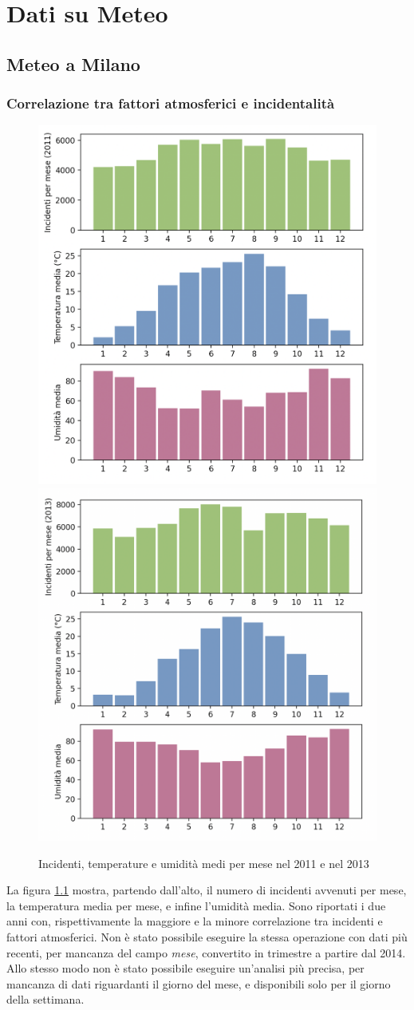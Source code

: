 \documentclass[a4paper]{report}
\begin{document}
\chapter{Dati su Meteo}

\section{Meteo a Milano}

\subsection{Correlazione tra fattori atmosferici e incidentalità}

\begin{figure}
    \includegraphics[width=0.5\linewidth]{../src/meteo/temp_incidenti_2011.png}
    \includegraphics[width=0.5\linewidth]{../src/meteo/temp_incidenti_2013.png}
    \caption{Incidenti, temperature e umidità medi per mese nel 2011 e nel 2013}
    \label{fig:incidenti-temp}
\end{figure}

La figura \ref{fig:incidenti-temp} mostra, partendo dall'alto, il numero di incidenti 
avvenuti per mese, la temperatura media per mese, e infine l'umidità media.
Sono riportati i due anni con, rispettivamente la maggiore e la minore correlazione tra 
incidenti e fattori atmosferici.
Non è stato possibile eseguire la stessa operazione con dati più recenti, per mancanza del 
campo \textit{mese}, convertito in trimestre a partire dal 2014.
Allo stesso modo non è stato possibile eseguire un'analisi più precisa, per mancanza di dati 
riguardanti il giorno del mese, e disponibili solo per il giorno della settimana.
\end{document}
